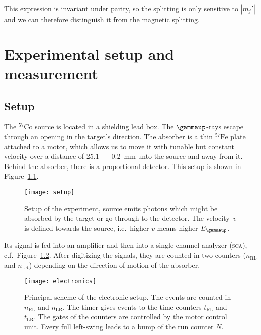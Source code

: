 \documentclass[11pt, english, fleqn, DIV=15, headinclude, BCOR=2cm]{scrreprt}
\newcommand\tRL{t_\text{RL}}
\newcommand\tLR{t_\text{LR}}
\newcommand\nRL{n_\text{RL}}
\newcommand\nLR{n_\text{LR}}
\begin{document}
This expression is invariant under parity, so the splitting is only sensitive
to $|m_j'|$ and we can therefore distinguish it from the magnetic splitting.

\parencite[33, 34]{Schatz/Nukleare_Festkoerperphysik}

\chapter{Experimental setup and measurement}

\section{Setup}

The $^{57}\mathrm{Co}$ source is located in a shielding lead box. The
$\gammaup$-rays escape through an opening in the target's direction. The
absorber is a thin $^{57}\mathrm{Fe}$ plate attached to a motor, which allows
us to move it with tunable but constant velocity over a distance of \SI{25.1 +-
0.2}{\milli\meter} unto the source and away from it. Behind the absorber, there
is a proportional detector. This setup is shown in Figure~\ref{fig:setup}.

\begin{figure}
    \centering
    \texttt{[image: setup]}
    \caption{%
        Setup of the experiment, source emits photons which might be absorbed
        by the target or go through to the detector. The velocity~$v$ is
        defined towards the source, i.e.\ higher $v$ means higher $E_\gammaup$.
    }
    \label{fig:setup}
\end{figure}

Its signal is fed into an amplifier and then into a single channel analyzer
(\textsc{sca}), c.f.\ Figure~\ref{fig:electronics}. After digitizing the
signals, they are counted in two counters ($n_\text{RL}$ and $n_\text{LR}$)
depending on the direction of motion of the absorber.

\begin{figure}
    \centering
    \texttt{[image: electronics]}
    \caption{%
        Principal scheme of the electronic setup. The events are counted in
        $\nRL$ and $\nLR$. The timer gives events to the time counters $\tRL$
        and $\tLR$. The gates of the counters are controlled by the motor
        control unit. Every full left-swing leads to a bump of the run counter
        $N$.
    }
    \label{fig:electronics}
\end{figure}
\end{document}
